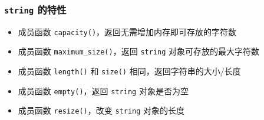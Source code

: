 \documentclass[UTF8]{ctexart}
\begin{document}
\subsubsection{\texttt{string} 的特性}
\begin{itemize}
    \item 成员函数 \texttt{capacity()}，返回无需增加内存即可存放的字符数
    \item 成员函数 \texttt{maximum\_size()}，返回 \texttt{string} 对象可存放的最大字符数
    \item 成员函数 \texttt{length()} 和 \texttt{size()} 相同，返回字符串的大小/长度
    \item 成员函数 \texttt{empty()}，返回 \texttt{string} 对象是否为空
    \item 成员函数 \texttt{resize()}，改变 \texttt{string} 对象的长度
\end{itemize}
\end{document}
